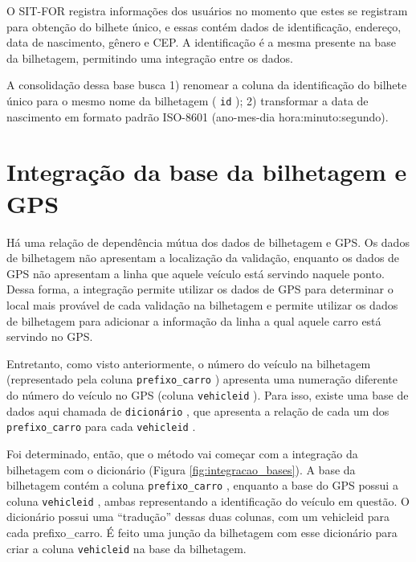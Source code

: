 \documentclass[        
    a4paper,          %
    12pt,             %
    chapter=TITLE,    %
    section=Title,    %
    subsection=Title, %
    oneside,          %
    english,          %
    spanish,          %
    brazil,           %
    fleqn             %
]{abntex2}
\let\oldtexttt\texttt
\renewcommand{\texttt}[1]{
  \colorbox{bgcolor}{\oldtexttt{#1}}
}
\begin{document}
  O SIT-FOR registra informações dos usuários no momento que estes se registram para obtenção do bilhete único, e essas contém dados de identificação, endereço, data de nascimento, gênero e CEP. A identificação é a mesma presente na base da bilhetagem, permitindo uma integração entre os dados.
  
  A consolidação dessa base busca 1) renomear a coluna da identificação do bilhete único para o mesmo nome da bilhetagem (\texttt{id}); 2) transformar a data de nascimento em formato padrão ISO-8601 (ano-mes-dia hora:minuto:segundo).
  
  \hypertarget{integracao-da-base-da-bilhetagem-e-gps}{%
  \section{Integração da base da bilhetagem e GPS}\label{integracao-da-base-da-bilhetagem-e-gps}}
  
  Há uma relação de dependência mútua dos dados de bilhetagem e GPS. Os dados de bilhetagem não apresentam a localização da validação, enquanto os dados de GPS não apresentam a linha que aquele veículo está servindo naquele ponto. Dessa forma, a integração permite utilizar os dados de GPS para determinar o local mais provável de cada validação na bilhetagem e permite utilizar os dados de bilhetagem para adicionar a informação da linha a qual aquele carro está servindo no GPS.
  
  Entretanto, como visto anteriormente, o número do veículo na bilhetagem (representado pela coluna \texttt{prefixo\_carro}) apresenta uma numeração diferente do número do veículo no GPS (coluna \texttt{vehicleid}). Para isso, existe uma base de dados aqui chamada de \texttt{dicionário}, que apresenta a relação de cada um dos \texttt{prefixo\_carro} para cada \texttt{vehicleid}.
  
  Foi determinado, então, que o método vai começar com a integração da bilhetagem com o dicionário (Figura \ref{fig:integracao_bases}). A base da bilhetagem contém a coluna \texttt{prefixo\_carro}, enquanto a base do GPS possui a coluna \texttt{vehicleid}, ambas representando a identificação do veículo em questão. O dicionário possui uma ``tradução'' dessas duas colunas, com um vehicleid para cada prefixo\_carro. É feito uma junção da bilhetagem com esse dicionário para criar a coluna \texttt{vehicleid} na base da bilhetagem.
  
  \begin{figure}[!h]
  \captionsetup{width=16cm}
  \centering
  \end{figure}
  
\end{document}

